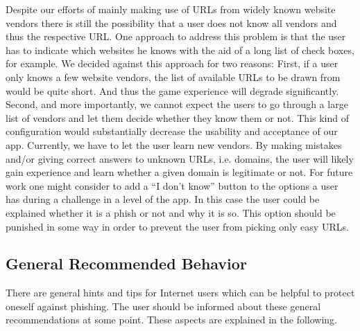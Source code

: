 \begin{description}[leftmargin=0cm]
\item[Unknown Website Vendors] Despite our efforts of mainly making use of URLs from widely known website vendors there is still the possibility that a user does not know all vendors and thus the respective URL. 
One approach to address this problem is that the user has to indicate which websites he knows with the aid of a long list of check boxes, for example. 
We decided against this approach for two reasons: 
First, if a user only knows a few website vendors, the list of available URLs to be drawn from would be quite short. 
And thus the game experience will degrade significantly. 
Second, and more importantly, we cannot expect the users to go through a large list of vendors and let them decide whether they know them or not. 
This kind of configuration would substantially decrease the usability and acceptance of our app. 
Currently, we have to let the user learn new vendors. 
By making mistakes and/or giving correct answers to unknown URLs, i.e. domains, the user will likely gain experience and learn whether a given domain is legitimate or not. 
For future work one might consider to add a ``I don't know'' button to the options a user has during a challenge in a level of the app.
In this case the user could be explained whether it is a phish or not and why it is so.
This option should be punished in some way in order to prevent the user from picking only easy URLs.
\end{description}


\subsection{General Recommended Behavior}
There are general hints and tips for Internet users which can be helpful to protect oneself against phishing.
The user should be informed about these general recommendations at some point.
These aspects are explained in the following.

